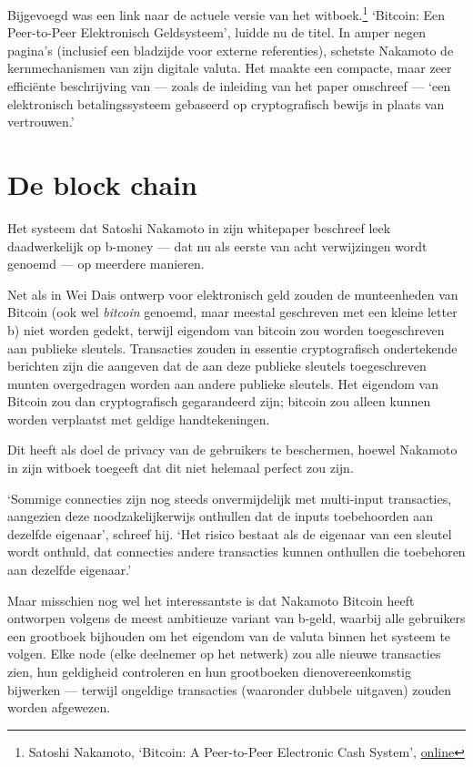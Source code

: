 \documentclass[smalldemyvopaper,11pt,twoside,onecolumn,openright,extrafontsizes,hidelinks]{memoir}
\begin{document}
Bijgevoegd was een link naar de actuele versie van het
witboek.\footnote{Satoshi Nakamoto, `Bitcoin: A Peer-to-Peer Electronic
  Cash System', \href{https://bitcoin.org/bitcoin.pdf}{online}}
`Bitcoin: Een Peer-to-Peer Elektronisch Geldsysteem', luidde nu de
titel. In amper negen pagina's (inclusief een bladzijde voor externe
referenties), schetste Nakamoto de kernmechanismen van zijn digitale
valuta. Het maakte een compacte, maar zeer efficiënte beschrijving van
--- zoals de inleiding van het paper omschreef --- `een elektronisch
betalingssysteem gebaseerd op cryptografisch bewijs in plaats van
vertrouwen.'

\section{De block chain}\label{de-block-chain}

Het systeem dat Satoshi Nakamoto in zijn whitepaper beschreef leek
daadwerkelijk op b-money --- dat nu als eerste van acht verwijzingen
wordt genoemd --- op meerdere manieren.

Net als in Wei Dais ontwerp voor elektronisch geld zouden de
munteenheden van Bitcoin (ook wel \emph{bitcoin} genoemd, maar meestal
geschreven met een kleine letter b) niet worden gedekt, terwijl eigendom
van bitcoin zou worden toegeschreven aan publieke sleutels. Transacties
zouden in essentie cryptografisch ondertekende berichten zijn die
aangeven dat de aan deze publieke sleutels toegeschreven munten
overgedragen worden aan andere publieke sleutels. Het eigendom van
Bitcoin zou dan cryptografisch gegarandeerd zijn; bitcoin zou alleen
kunnen worden verplaatst met geldige handtekeningen.

Dit heeft als doel de privacy van de gebruikers te beschermen, hoewel
Nakamoto in zijn witboek toegeeft dat dit niet helemaal perfect zou
zijn.

`Sommige connecties zijn nog steeds onvermijdelijk met multi-input
transacties, aangezien deze noodzakelijkerwijs onthullen dat de inputs
toebehoorden aan dezelfde eigenaar', schreef hij. `Het risico bestaat
als de eigenaar van een sleutel wordt onthuld, dat connecties andere
transacties kunnen onthullen die toebehoren aan dezelfde eigenaar.'

Maar misschien nog wel het interessantste is dat Nakamoto Bitcoin heeft
ontworpen volgens de meest ambitieuze variant van b-geld, waarbij alle
gebruikers een grootboek bijhouden om het eigendom van de valuta binnen
het systeem te volgen. Elke node (elke deelnemer op het netwerk) zou
alle nieuwe transacties zien, hun geldigheid controleren en hun
grootboeken dienovereenkomstig bijwerken --- terwijl ongeldige
transacties (waaronder dubbele uitgaven) zouden worden afgewezen.
\end{document}
